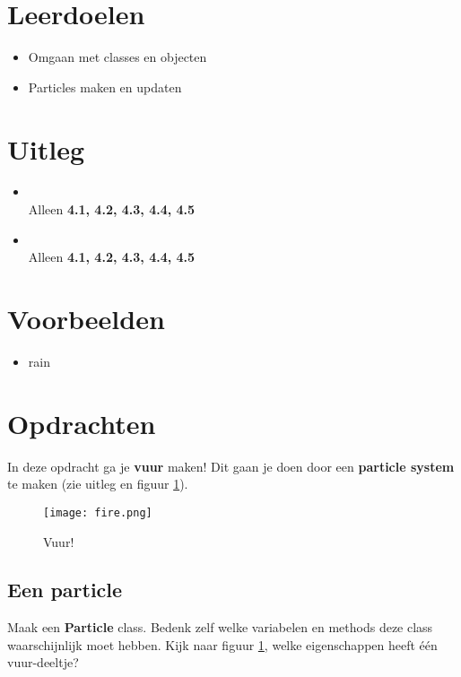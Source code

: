 \documentclass[../syllabus.tex]{subfiles}
\begin{document}
\section{Leerdoelen}
\begin{itemize}
\item Omgaan met classes en objecten
\item Particles maken en updaten
\end{itemize}

\section{Uitleg}
\begin{itemize}
\item {}\\
    Alleen \textbf{4.1, 4.2, 4.3, 4.4, 4.5}
    \item {}\\
    Alleen \textbf{4.1, 4.2, 4.3, 4.4, 4.5}\\
\end{itemize}

\section{Voorbeelden}
\begin{itemize}
    \item rain
\end{itemize}

\newpage
\section{Opdrachten}
In deze opdracht ga je \textbf{vuur} maken! Dit gaan je doen door een \textbf{particle system} te maken (zie uitleg en figuur \ref{fig:fire}).

\begin{figure}[H]
	\centering
	\texttt{[image: fire.png]}
	\caption{Vuur!}
	\label{fig:fire}
\end{figure}

\subsection{Een particle}
Maak een \textbf{Particle} class. Bedenk zelf welke variabelen en methods deze class waarschijnlijk moet hebben. Kijk naar figuur \ref{fig:fire}, welke eigenschappen heeft \'e\'en vuur-deeltje?
\end{document}

